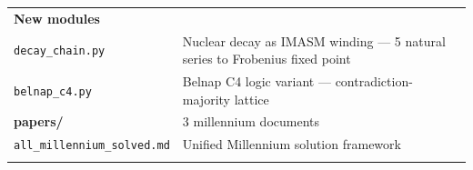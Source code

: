 \documentclass[12pt,a4paper]{article}
\begin{document}
\begin{longtable}[]{@{}lll@{}}
\begin{minipage}[t]{0.23\columnwidth}
\textbf{New modules}\strut
\end{minipage} & \begin{minipage}[t]{0.26\columnwidth}\raggedright
\strut
\end{minipage} & \begin{minipage}[t]{0.42\columnwidth}\raggedright
\strut
\end{minipage}\tabularnewline
\begin{minipage}[t]{0.23\columnwidth}\raggedright
\texttt{decay\_chain.py}\strut
\end{minipage} & \begin{minipage}[t]{0.26\columnwidth}\raggedright
Nuclear decay as IMASM winding --- 5 natural series to Frobenius fixed
point\strut
\end{minipage} & \begin{minipage}[t]{0.42\columnwidth}\raggedright
\strut
\end{minipage}\tabularnewline
\begin{minipage}[t]{0.23\columnwidth}\raggedright
\texttt{belnap\_c4.py}\strut
\end{minipage} & \begin{minipage}[t]{0.26\columnwidth}\raggedright
Belnap C4 logic variant --- contradiction-majority lattice\strut
\end{minipage} & \begin{minipage}[t]{0.42\columnwidth}\raggedright
\strut
\end{minipage}\tabularnewline
\begin{minipage}[t]{0.23\columnwidth}\raggedright
\textbf{papers/}\strut
\end{minipage} & \begin{minipage}[t]{0.26\columnwidth}\raggedright
3 millennium documents\strut
\end{minipage} & \begin{minipage}[t]{0.42\columnwidth}\raggedright
\strut
\end{minipage}\tabularnewline
\begin{minipage}[t]{0.23\columnwidth}\raggedright
\texttt{all\_millennium\_solved.md}\strut
\end{minipage} & \begin{minipage}[t]{0.26\columnwidth}\raggedright
Unified Millennium solution framework\strut
\end{minipage} & \begin{minipage}[t]{0.42\columnwidth}\raggedright
\strut
\end{minipage}\tabularnewline
\begin{minipage}[t]{0.23\columnwidth}\raggedright

\end{minipage}
\end{longtable}
\end{document}
